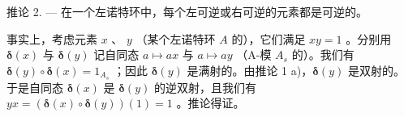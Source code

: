 推论 2. --- 在一个左诺特环中，每个左可逆或右可逆的元素都是可逆的。

事实上，考虑元素 \(x\) 、 \(y\) （某个左诺特环 \(A\) 的），它们满足 \(xy = 1\) 。分别用 \(\pmb{\delta}(x)\) 与 \(\pmb{\delta}(y)\) 记自同态 \(a \mapsto ax\) 与 \(a \mapsto ay\) （A-模 \(A_s\) 的）。我们有 \(\pmb{\delta}(y) \circ \pmb{\delta}(x) = 1_{A_s}\) ；因此 \(\pmb{\delta}(y)\) 是满射的。由推论 1 a)，\(\pmb{\delta}(y)\) 是双射的。于是自同态 \(\pmb{\delta}(x)\) 是 \(\pmb{\delta}(y)\) 的逆双射，且我们有 \(yx = (\pmb{\delta}(x) \circ \pmb{\delta}(y))(1) = 1\) 。推论得证。

